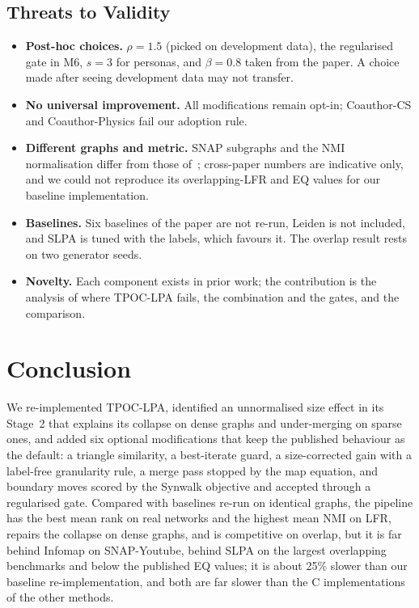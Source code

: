 \documentclass[conference]{IEEEtran}
\begin{document}
\subsection{Threats to Validity}\label{sec:limits}
\begin{itemize}
\item \textbf{Post-hoc choices.} $\rho=1.5$ (picked on development data), the regularised gate in M6, $s=3$ for personas, and $\beta=0.8$ taken from the paper. A choice made after seeing development data may not transfer.
\item \textbf{No universal improvement.} All modifications remain opt-in; Coauthor-CS and Coauthor-Physics fail our adoption rule.
\item \textbf{Different graphs and metric.} SNAP subgraphs and the NMI normalisation differ from those of~\cite{kong2026}; cross-paper numbers are indicative only, and we could not reproduce its overlapping-LFR and EQ values for our baseline implementation.
\item \textbf{Baselines.} Six baselines of the paper are not re-run, Leiden is not included, and SLPA is tuned with the labels, which favours it. The overlap result rests on two generator seeds.
\item \textbf{Novelty.} Each component exists in prior work; the contribution is the analysis of where TPOC-LPA fails, the combination and the gates, and the comparison.
\end{itemize}

\section{Conclusion}
We re-implemented TPOC-LPA, identified an unnormalised size effect in its Stage~2 that explains its collapse on dense graphs and under-merging on sparse ones, and added six optional modifications that keep the published behaviour as the default: a triangle similarity, a best-iterate guard, a size-corrected gain with a label-free granularity rule, a merge pass stopped by the map equation, and boundary moves scored by the Synwalk objective and accepted through a regularised gate. Compared with baselines re-run on identical graphs, the pipeline has the best mean rank on real networks and the highest mean NMI on LFR, repairs the collapse on dense graphs, and is competitive on overlap, but it is far behind Infomap on SNAP-Youtube, behind SLPA on the largest overlapping benchmarks and below the published EQ values; it is about 25\% slower than our baseline re-implementation, and both are far slower than the C implementations of the other methods.
\end{document}
